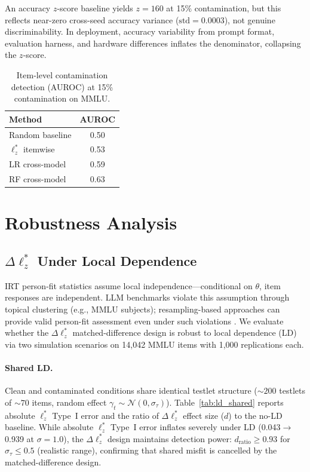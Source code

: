 An accuracy $z$-score baseline yields $z{=}160$ at 15\% contamination, but this reflects near-zero cross-seed accuracy variance ($\text{std}{=}0.0003$), not genuine discriminability.
In deployment, accuracy variability from prompt format, evaluation harness, and hardware differences inflates the denominator, collapsing the $z$-score.

\begin{table}[t]
\centering
\caption{Item-level contamination detection (AUROC) at 15\% contamination on MMLU.}
\label{tab:item_auroc}
\footnotesize
\begin{tabular}{@{}lc@{}}
\toprule
Method & AUROC \\
\midrule
Random baseline & 0.50 \\
$\ell_z^*$ itemwise & 0.53 \\
LR cross-model & 0.59 \\
RF cross-model & 0.63 \\
\bottomrule
\end{tabular}
\end{table}

\section{Robustness Analysis}
\label{app:robustness}

\subsection{$\Delta\ell_z^*$ Under Local Dependence}
\label{app:local_dep}

IRT person-fit statistics assume local independence---conditional on $\theta$, item responses are independent.
LLM benchmarks violate this assumption through topical clustering (e.g., MMLU subjects); resampling-based approaches can provide valid person-fit assessment even under such violations \citep{sinharay2016}.
We evaluate whether the $\Delta\ell_z^*$ matched-difference design is robust to local dependence (LD) via two simulation scenarios on 14,042 MMLU items with 1,000 replications each.

\paragraph{Shared LD.}
Clean and contaminated conditions share identical testlet structure (${\sim}200$ testlets of ${\sim}70$ items, random effect $\gamma_t \sim \mathcal{N}(0, \sigma_\tau)$).
Table~\ref{tab:ld_shared} reports absolute $\ell_z^*$ Type~I error and the ratio of $\Delta\ell_z^*$ effect size ($d$) to the no-LD baseline.
While absolute $\ell_z^*$ Type~I error inflates severely under LD (0.043$\to$0.939 at $\sigma{=}1.0$), the $\Delta\ell_z^*$ design maintains detection power: $d_{\text{ratio}} \geq 0.93$ for $\sigma_\tau \leq 0.5$ (realistic range), confirming that shared misfit is cancelled by the matched-difference design.

